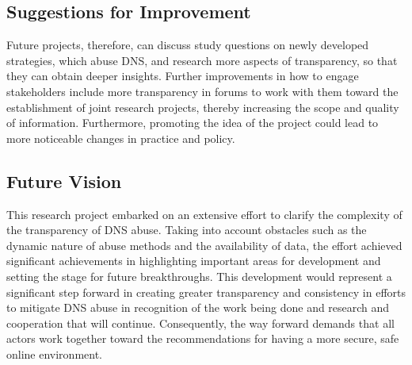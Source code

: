 \subsection{Suggestions for Improvement}


Future projects, therefore, can discuss study questions on newly developed strategies, which abuse DNS, and research more aspects of transparency, so that they can obtain deeper insights. Further improvements in how to engage stakeholders include more transparency in forums to work with them toward the establishment of joint research projects, thereby increasing the scope and quality of information. Furthermore, promoting the idea of the project could lead to more noticeable changes in practice and policy.


\subsection{Future Vision}

This research project embarked on an extensive effort to clarify the complexity of the transparency of DNS abuse. Taking into account obstacles such as the dynamic nature of abuse methods and the availability of data, the effort achieved significant achievements in highlighting important areas for development and setting the stage for future breakthroughs. This development would represent a significant step forward in creating greater transparency and consistency in efforts to mitigate DNS abuse in recognition of the work being done and research and cooperation that will continue. Consequently, the way forward demands that all actors work together toward the recommendations for having a more secure, safe online environment.
